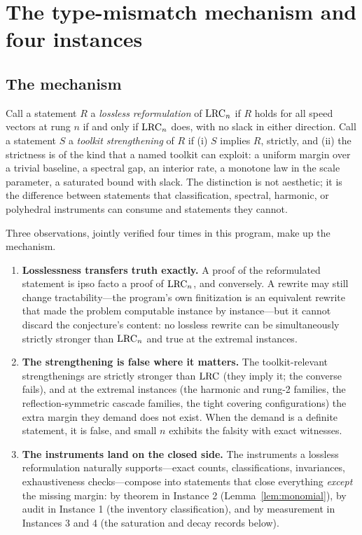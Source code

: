 
\section{The type-mismatch mechanism and four instances}\label{sec:tm}

\subsection{The mechanism}\label{sec:tm-mech}

Call a statement $R$ a \emph{lossless reformulation} of $\mathrm{LRC}_n$ if $R$
holds for all speed vectors at rung $n$ if and only if $\mathrm{LRC}_n$ does, with
no slack in either direction. Call a statement $S$ a \emph{toolkit
strengthening} of $R$ if (i) $S$ implies $R$, strictly, and (ii) the
strictness is of the kind that a named toolkit can exploit: a uniform
margin over a trivial baseline, a spectral gap, an interior rate, a
monotone law in the scale parameter, a saturated bound with slack. The
distinction is not aesthetic; it is the difference between statements
that classification, spectral, harmonic, or polyhedral instruments can
consume and statements they cannot.

Three observations, jointly verified four times in this program, make up
the mechanism.

\begin{enumerate}[leftmargin=1.6em,itemsep=2pt]
\item \textbf{Losslessness transfers truth exactly.} A proof of the
reformulated statement is ipso facto a proof of $\mathrm{LRC}_n$, and conversely.
A rewrite may still change tractability---the program's own finitization
is an equivalent rewrite that made the problem computable instance by
instance---but it cannot discard the conjecture's content: no lossless
rewrite can be simultaneously strictly stronger than $\mathrm{LRC}_n$ and true
at the extremal instances.
\item \textbf{The strengthening is false where it matters.} The
toolkit-relevant strengthenings are strictly stronger than $\mathrm{LRC}$ (they
imply it; the converse fails), and at the extremal instances (the
harmonic and rung-2 families, the reflection-symmetric cascade families,
the tight covering configurations) the extra margin they demand does not
exist. When the demand is a definite statement, it is false, and small
$n$ exhibits the falsity with exact witnesses.
\item \textbf{The instruments land on the closed side.} The instruments a
lossless reformulation naturally supports---exact counts,
classifications, invariances, exhaustiveness checks---compose into
statements that close everything \emph{except} the missing margin: by
theorem in Instance 2 (Lemma~\ref{lem:monomial}), by audit in Instance 1
(the inventory classification), and by measurement in Instances 3 and 4
(the saturation and decay records below).
\end{enumerate}

